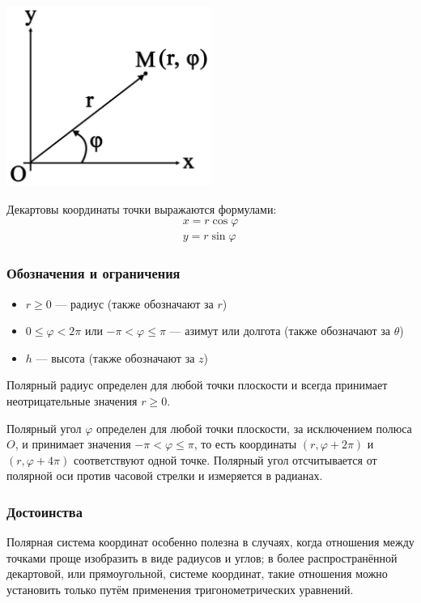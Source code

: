 \documentclass[a4paper,12pt]{extbook}
\theoremstyle{numbered}
\theoremstyle{named}
\theoremstyle{named}
\theoremstyle{named}
\begin{document}
\begin{center}
    \includegraphics[width=0.5\textwidth]{polar_system.png}
\end{center}

Декартовы координаты точки выражаются формулами:
\begin{gather*}
    x = r \cos{\varphi} \\
    y = r \sin{\varphi}
\end{gather*}

\subsubsection*{Обозначения и ограничения}
\begin{itemize}
    \item {\(r \geq 0\) — радиус (также обозначают за \(r\))}
    \item {\(0 \leq \varphi < 2\pi\) или \(-\pi < \varphi \leq \pi\) — азимут или долгота (также обозначают за \(\theta\))}
    \item {\(h\) — высота (также обозначают за \(z\))}
\end{itemize}

Полярный радиус определен для любой точки плоскости и всегда принимает неотрицательные значения \(r \geq 0\).

Полярный угол \(\varphi\) определен для любой точки плоскости, за исключением полюса \(O\), и принимает значения \(-\pi < \varphi \leq \pi\), то есть координаты \((r, \varphi + 2\pi)\) и  \((r, \varphi + 4\pi)\) соответствуют одной точке.
Полярный угол отсчитывается от полярной оси против часовой стрелки и измеряется в радианах.

\subsubsection*{Достоинства}
Полярная система координат особенно полезна в случаях, когда отношения между точками проще изобразить в виде радиусов и углов; в более распространённой декартовой, или прямоугольной, системе координат, такие отношения можно установить только путём применения тригонометрических уравнений.
\end{document}
